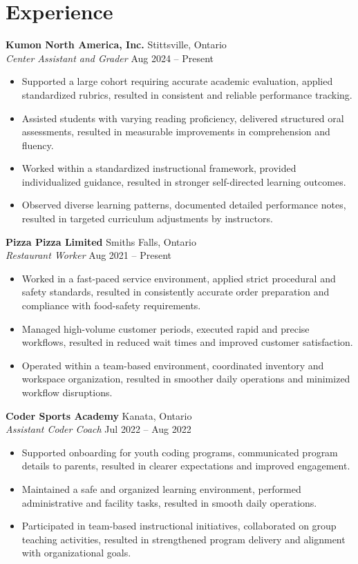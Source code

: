 \documentclass[12pt,letterpaper]{article}
\begin{document}
	\section{Experience}
	\noindent
	\textbf{Kumon North America, Inc.} \hfill Stittsville, Ontario \\
	\textsl{Center Assistant and Grader} \hfill Aug 2024 -- Present
	\begin{itemize}
		\item Supported a large cohort requiring accurate academic evaluation, applied standardized rubrics, resulted in consistent and reliable performance tracking.
		\item Assisted students with varying reading proficiency, delivered structured oral assessments, resulted in measurable improvements in comprehension and fluency.
		\item Worked within a standardized instructional framework, provided individualized guidance, resulted in stronger self-directed learning outcomes.
		\item Observed diverse learning patterns, documented detailed performance notes, resulted in targeted curriculum adjustments by instructors.
	\end{itemize}
	
	\vspace{5pt}
	\noindent
	\textbf{Pizza Pizza Limited} \hfill Smiths Falls, Ontario \\
	\textsl{Restaurant Worker} \hfill Aug 2021 -- Present
	\begin{itemize}
		\item Worked in a fast-paced service environment, applied strict procedural and safety standards, resulted in consistently accurate order preparation and compliance with food-safety requirements.
		\item Managed high-volume customer periods, executed rapid and precise workflows, resulted in reduced wait times and improved customer satisfaction.
		\item Operated within a team-based environment, coordinated inventory and workspace organization, resulted in smoother daily operations and minimized workflow disruptions.
	\end{itemize}
	
	\vspace{5pt}
	\noindent
	\textbf{Coder Sports Academy} \hfill Kanata, Ontario \\
	\textsl{Assistant Coder Coach} \hfill Jul 2022 -- Aug 2022
	\begin{itemize}
		\item Supported onboarding for youth coding programs, communicated program details to parents, resulted in clearer expectations and improved engagement.
		\item Maintained a safe and organized learning environment, performed administrative and facility tasks, resulted in smooth daily operations.
		\item Participated in team-based instructional initiatives, collaborated on group teaching activities, resulted in strengthened program delivery and alignment with organizational goals.
	\end{itemize}
	
\end{document}
